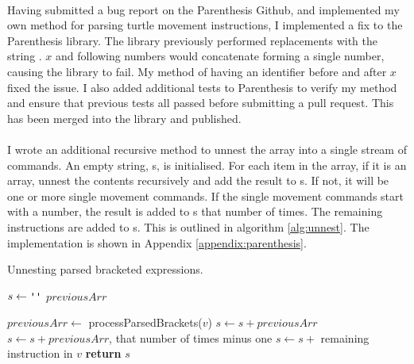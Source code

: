 \paragraph{} Having submitted a bug report on the Parenthesis Github, and implemented my own method for parsing turtle movement instructions, I implemented a fix to the Parenthesis library. The library previously performed replacements with the string . $x$ and following numbers would concatenate forming a single number, causing the library to fail. My method of having an identifier before and after $x$ fixed the issue. I also added additional tests to Parenthesis to verify my method and ensure that previous tests all passed before submitting a pull request. This has been merged into the library and published.

\paragraph{} I wrote an additional recursive method to unnest the array into a single stream of commands. An empty string, s, is initialised. For each item in the array, if it is an array, unnest the contents recursively and add the result to s. If not, it will be one or more single movement commands. If the single movement commands start with a number, the result is added to s that number of times. The remaining instructions are added to s. This is outlined in algorithm \ref{alg:unnest}. The implementation is shown in Appendix \ref{appendix:parenthesis}.

\begin{algorithm}[!htbp]
\caption{Unnesting parsed bracketed expressions.}
\label{alg:unnest}
\begin{algorithmic}[1]

   \State $s\gets \texttt{\upquote{}}$
   \State $previousArr$

     \State $previousArr \gets$ processParsedBrackets($v$)
    \Else
        \State $s \gets s + previousArr$
          \State $s \gets s + previousArr$, that number of times minus one
        \EndIf
       \EndIf
       \State $s \gets s + $ remaining instruction in $v$
    \EndIf
   \EndFor
   \State \textbf{return} $s$

\EndProcedure
\end{algorithmic}
\end{algorithm}

